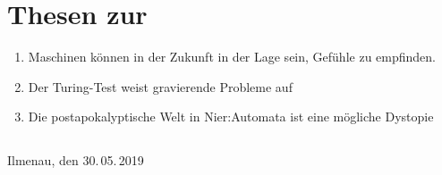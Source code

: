 
\chapter*{Thesen zur \artderausarbeitung}

\begin{enumerate}
\item Maschinen können in der Zukunft in der Lage sein, Gefühle zu empfinden.
\item Der Turing-Test weist gravierende Probleme auf
\item Die postapokalyptische Welt in Nier:Automata ist eine mögliche Dystopie
\end{enumerate}

\section*{}

Ilmenau, den 30.\,05.\,2019\hfill \namedesautors
